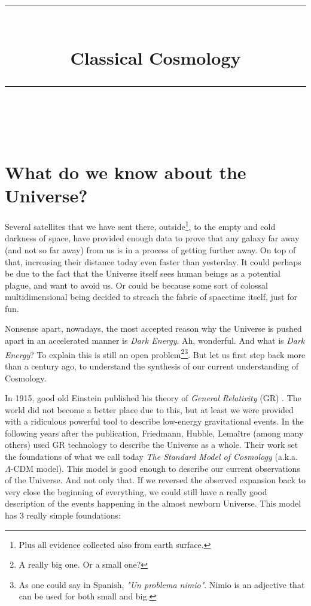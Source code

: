 \documentclass[11pt, a4paper]{article} %
\title{	
	\normalfont\normalsize
	\textsc{}\\ %
	\vspace{5pt} %
	\rule{\linewidth}{0.2pt}\\ %
	\vspace{10pt} %
	{\huge Classical Cosmology}\\ %
	\vspace{5pt} %
	\rule{\linewidth}{-2pt}\\ %
	\vspace{-25pt} %
	\date{}
}
\author{}
\begin{document}
\maketitle 



\section*{What do we know about the Universe?}

Several satellites that we have sent there, outside\footnote{Plus all evidence collected also from earth surface.}, to the empty and cold darkness of space, have provided enough data to prove that any galaxy far away (and not so far away) from us is in a process of getting further away. On top of that, increasing their distance today even faster than yesterday. It could perhaps be due to the fact that the Universe itself sees human beings as a potential plague, and want to avoid us. Or could be because some sort of colossal multidimensional being decided to streach the fabric of spacetime itself, just for fun.

Nonsense apart, nowadays, the most accepted reason why the Universe is pushed apart in an accelerated manner is \textit{Dark Energy}. Ah, wonderful. And what is \textit{Dark Energy}? To explain this is still an open problem\footnote{A really big one. Or a small one?}\footnote{As one could say in Spanish, \textit{"Un problema nimio"}. Nimio is an adjective that can be used for both small and big.}. But let us first step back more than a century ago, to understand the synthesis of our current understanding of Cosmology.


In 1915, good old Einstein published his theory of \textit{General Relativity} (GR) \cite{einstein1915feldgleichungen}. The world did not become a better place due to this, but at least we were provided with a ridiculous powerful tool to describe low-energy gravitational events. In the following years after the publication, Friedmann, Hubble, Lema\^itre \cite{friedmann1922krummung,hubble1929relation,lemaitre1927univers} (among many others) used GR technology to describe the Universe as a whole. Their work set the foundations of what we call today \textit{The Standard Model of Cosmology} (a.k.a. $\Lambda$-CDM model). This model is good enough to describe our current observations of the Universe. And not only that. If we reversed the observed expansion back to very close the beginning of everything, we could still have a really good description of the events happening in the almost newborn Universe. This model has 3 really simple foundations:
\end{document}
